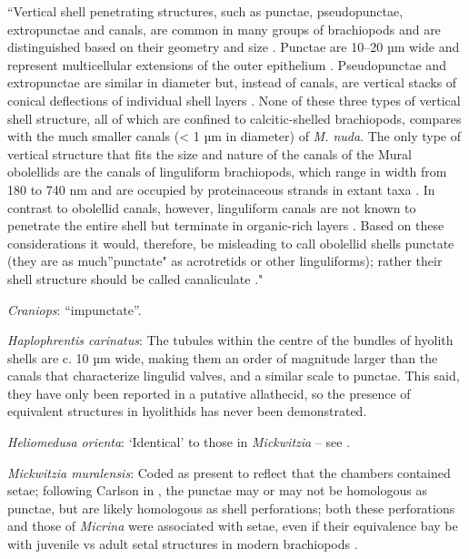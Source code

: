 \documentclass[openany]{book}
\theoremstyle{definition}
\theoremstyle{definition}
\theoremstyle{definition}
\theoremstyle{remark}
\begin{document}
``Vertical shell penetrating structures, such as punctae, pseudopunctae,
extropunctae and canals, are common in many groups of brachiopods and
are distinguished based on their geometry and size
\citep{Williams1997Introduction}. Punctae are 10--20 µm wide and
represent multicellular extensions of the outer epithelium
\citep{Owen1969Thecaecum}. Pseudopunctae and extropunctae are similar in
diameter but, instead of canals, are vertical stacks of conical
deflections of individual shell layers \citep{Williams1993Roleof}. None
of these three types of vertical shell structure, all of which are
confined to calcitic-shelled brachiopods, compares with the much smaller
canals (\textless{} 1 µm in diameter) of \emph{M. nuda}. The only type
of vertical structure that fits the size and nature of the canals of the
Mural obolellids are the canals of linguliform brachiopods, which range
in width from 180 to 740 nm and are occupied by proteinaceous strands in
extant taxa
\citep{Williams1992Structureof, Williams1994Collagenouschitino, Williams1997Introduction}.
In contrast to obolellid canals, however, linguliform canals are not
known to penetrate the entire shell but terminate in organic-rich layers
\citep{Williams1997Introduction}. Based on these considerations it
would, therefore, be misleading to call obolellid shells punctate (they
are as much''punctate" as acrotretids or other linguliforms); rather
their shell structure should be called canaliculate
\citep{Williams1997Introduction}."

\hypertarget{Craniops-coding-132}{}
\emph{Craniops}: ``impunctate''.

\hypertarget{Haplophrentis_carinatus-coding-132}{}
\emph{Haplophrentis carinatus}: The tubules within the centre of the
bundles of hyolith shells \citep{Kouchinsky2000Skeletalmicrostructures}
are c. 10 µm wide, making them an order of magnitude larger than the
canals that characterize lingulid valves, and a similar scale to
punctae. This said, they have only been reported in a putative
allathecid, so the presence of equivalent structures in hyolithids has
never been demonstrated.

\hypertarget{Heliomedusa_orienta-coding-132}{}
\emph{Heliomedusa orienta}: `Identical' to those in \emph{Mickwitzia} --
see \citet{Williams2007Supplement}.

\hypertarget{Mickwitzia_muralensis-coding-132}{}
\emph{Mickwitzia muralensis}: Coded as present to reflect that the
chambers contained setae; following Carlson in
\citet{Williams2007Supplement}, the punctae may or may not be homologous
as punctae, but are likely homologous as shell perforations; both these
perforations and those of \emph{Micrina} were associated with setae,
even if their equivalence bay be with juvenile vs adult setal structures
in modern brachiopods \citep[p.~397]{Balthasar2004Shellstructure}.
\end{document}

